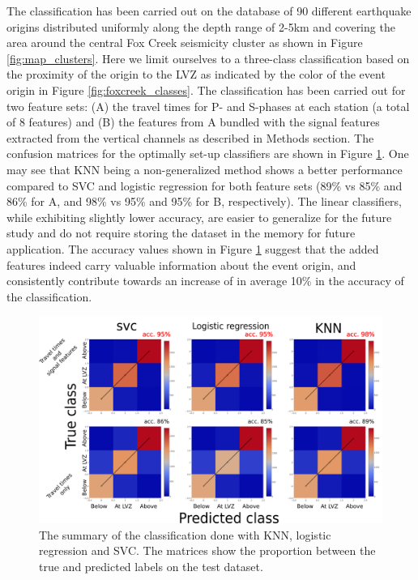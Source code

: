 \documentclass[letterpaper,11pt]{article}
\begin{document}
The classification has been carried out on the database of 90 different earthquake origins distributed uniformly along the depth range of 2-5km and covering the area around the central Fox Creek seismicity cluster as shown in Figure \ref{fig:map_clusters}. Here we limit ourselves to a three-class classification based on the proximity of the origin to the LVZ as indicated by the color of the event origin in Figure \ref{fig:foxcreek_classes}.
The classification has been carried out for two feature sets: (A) the travel times for P- and S-phases at each station (a total of 8 features) and (B) the features from A bundled with the signal features extracted from the vertical channels as described in Methods section. The confusion matrices for the optimally set-up classifiers are shown in Figure \ref{fig:confusion}. One may see that KNN being a non-generalized method shows a better performance compared to SVC and logistic regression for both feature sets (89\% vs 85\% and 86\% for A, and 98\% vs 95\% and 95\% for B, respectively). The linear classifiers, while exhibiting slightly lower accuracy, are easier to generalize for the future study and do not require storing the dataset in the memory for future application.
The accuracy values shown in Figure \ref{fig:confusion} suggest that the added features indeed carry valuable information about the event origin, and consistently contribute towards an increase of in average 10\% in the accuracy of the classification.
\begin{figure}[htb]
\begin{center}
\includegraphics[width=0.5\linewidth,angle=0]{./AntonBiryukov_bibtex/Figure_confusion_horiz.png}
\end{center}
\vspace{-4mm}
\caption{The summary of the classification done with KNN, logistic regression and SVC. The matrices show the proportion between the true and predicted labels on the test dataset.}
\label{fig:confusion}
\end{figure}
\end{document}
